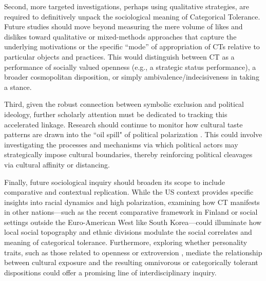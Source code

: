 \documentclass[12pt]{article}
\begin{document}
Second, more targeted investigations, perhaps using qualitative strategies, are required to definitively unpack the sociological meaning of Categorical Tolerance. Future studies should move beyond measuring the mere volume of likes and dislikes toward qualitative or mixed-methods approaches that capture the underlying motivations or the specific ``mode'' of appropriation of CTs relative to particular objects and practices. This would distinguish between CT as a performance of socially valued openness (e.g., a strategic status performance), a broader cosmopolitan disposition, or simply ambivalence/indecisiveness in taking a stance.

Third, given the robust connection between symbolic exclusion and political ideology, further scholarly attention must be dedicated to tracking this accelerated linkage. Research should continue to monitor how cultural taste patterns are drawn into the ``oil spill" of political polarization \citep{dellaposta2020pluralistic-ed4}. This could involve investigating the processes and mechanisms via which political actors may strategically impose cultural boundaries, thereby reinforcing political cleavages via cultural affinity or distancing.

Finally, future sociological inquiry should broaden its scope to include comparative and contextual replication. While the US context provides specific insights into racial dynamics and high polarization, examining how CT manifests in other nations---such as the recent comparative framework in Finland or social settings outside the Euro-American West like South Korea---could illuminate how local social topography and ethnic divisions modulate the social correlates and meaning of categorical tolerance. Furthermore, exploring whether personality traits, such as those related to openness or extroversion \citep{andrews2022culture-390}, mediate the relationship between cultural exposure and the resulting omnivorous or categorically tolerant dispositions could offer a promising line of interdisciplinary inquiry.

\newpage


\end{document}
